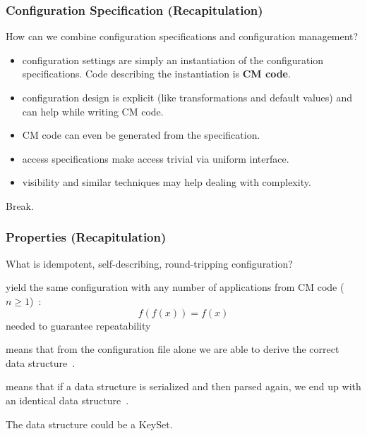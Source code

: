 \begin{frame}
	\frametitle{Configuration Specification (Recapitulation)}

	\begin{task}
	How can we combine configuration specifications and configuration management?
	\end{task}

	\pause

	\begin{itemize} %
	\item configuration settings are simply an instantiation of the configuration specifications.
		Code describing the instantiation is \textbf{CM code}.
	\item configuration design is explicit (like transformations and default values) and can help while writing CM code.
	\item CM code can even be generated from the specification.
	\item access specifications make access trivial via uniform interface.
	\item visibility and similar techniques may help dealing with complexity.
	\end{itemize}
\end{frame}

\begin{assignment}
	\begin{task}
	Break.
	\end{task}
\end{assignment}


\begin{frame}
	\frametitle{Properties (Recapitulation)}

	\begin{task}
	What is idempotent, self-describing, round-tripping configuration?
	\end{task}

	\pause


	\begin{description}[labelsep=3cm,align=right]
	\item[Idempotent]
	yield the same configuration with any number of applications from CM code ($n\ge1$)~\cite{waldemar2013testing}:
	\[
		f(f(x))=f(x)
	\]
	needed to guarantee repeatability

	\item[Self-describing]
	means that from the configuration file alone we are able to derive the correct data structure~\cite{wadler2003xml}.

	\item[Round-tripping]
	means that if a data structure is serialized and then parsed again, we end up with an identical data structure~\cite{wadler2003xml}.
	\end{description}

	The data structure could be a KeySet.
\end{frame}

